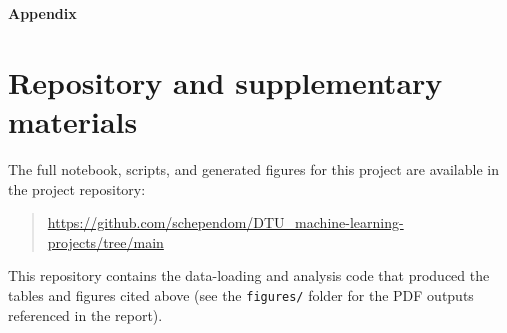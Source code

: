 \documentclass[dtu]{dtuarticle}
\begin{document}
	\vspace*{1cm}
	\appendix

	\LARGE\bfseries Appendix

	\normalsize\normalfont

	\section{Repository and supplementary materials}
	The full notebook, scripts, and generated figures for this project are available in the project repository:
	\begin{quote}
	\url{https://github.com/schependom/DTU\_machine-learning-projects/tree/main}
	\end{quote}
	This repository contains the data-loading and analysis code that produced the tables and figures cited
	above (see the \texttt{figures/} folder for the PDF outputs referenced in the report).
%
%

\end{document}

